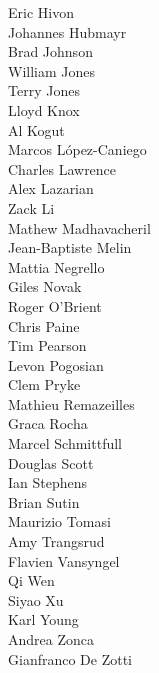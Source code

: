 \documentclass[PICOReport.tex]{subfiles}
\begin{document}
{\begin{multicols}{4}
Eric Hivon                      \\
Johannes Hubmayr                \\
Brad Johnson                    \\
William Jones                   \\
Terry Jones                     \\
Lloyd Knox                      \\
Al Kogut                        \\
Marcos L\'{o}pez-Caniego        \\
Charles Lawrence                \\
Alex Lazarian                   \\
Zack Li                         \\
Mathew Madhavacheril            \\
Jean-Baptiste Melin             \\
Mattia Negrello                 \\
Giles Novak                     \\
Roger O'Brient                  \\
Chris Paine                     \\
Tim Pearson                     \\
Levon Pogosian                  \\
Clem Pryke                      \\
Mathieu Remazeilles             \\
Graca Rocha                     \\
Marcel Schmittfull              \\
Douglas Scott                   \\
Ian Stephens                    \\
Brian Sutin                     \\
Maurizio Tomasi                 \\
Amy Trangsrud                   \\
Flavien Vansyngel               \\
Qi Wen                          \\
Siyao Xu                        \\
Karl Young                      \\
Andrea Zonca                    \\
Gianfranco De Zotti             
\end{multicols}
}
\end{document}
